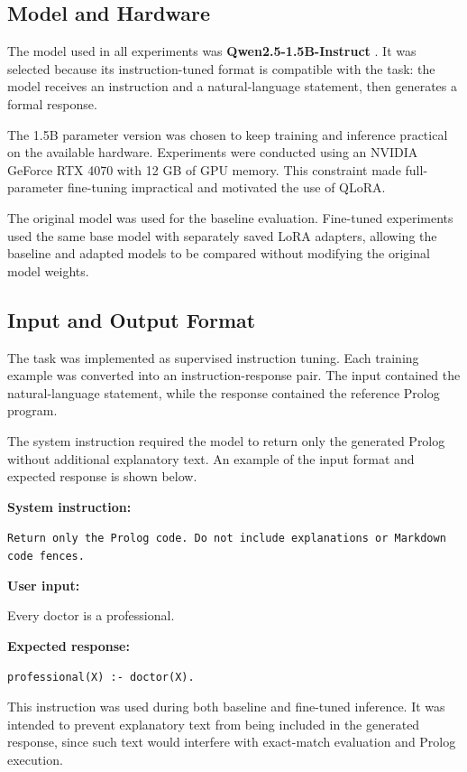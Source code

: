 \documentclass[11pt]{article} %
\theoremstyle{plain}
\theoremstyle{definition}
\begin{document}
\subsection{Model and Hardware}

The model used in all experiments was \textbf{Qwen2.5-1.5B-Instruct} \cite{qwen25}. It was
selected because its instruction-tuned format is compatible with the task: the
model receives an instruction and a natural-language statement, then generates
a formal response.

The 1.5B parameter version was chosen to keep training and inference practical
on the available hardware. Experiments were conducted using an NVIDIA GeForce
RTX 4070 with 12 GB of GPU memory. This constraint made full-parameter
fine-tuning impractical and motivated the use of QLoRA.

The original model was used for the baseline evaluation. Fine-tuned experiments
used the same base model with separately saved LoRA adapters, allowing the
baseline and adapted models to be compared without modifying the original model
weights.

\subsection{Input and Output Format}

The task was implemented as supervised instruction tuning. Each training example
was converted into an instruction-response pair. The input contained the
natural-language statement, while the response contained the reference Prolog
program.

The system instruction required the model to return only the generated Prolog
without additional explanatory text. An example of the input format and expected
response is shown below.

\begin{tcolorbox}
\textbf{System instruction:}

\texttt{Return only the Prolog code. Do not include explanations or
Markdown code fences.}

\medskip

\textbf{User input:}

Every doctor is a professional.

\medskip

\textbf{Expected response:}

\texttt{professional(X) :- doctor(X).}
\end{tcolorbox}

This instruction was used during both baseline and fine-tuned inference. It was
intended to prevent explanatory text from being included in the generated response,
since such text would interfere with exact-match evaluation and Prolog execution.
\end{document}

